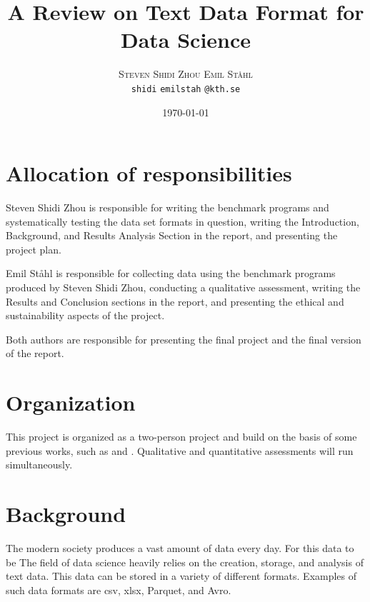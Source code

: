 \documentclass[12pt,twoside,english]{article}
\title{A Review on Text Data Format for Data Science}
\author{
        \textsc{Steven Shidi Zhou}
            \qquad
        \textsc{Emil Ståhl}
        \mbox{}\\
        \normalsize
            \texttt{shidi}
        \textbar{}
            \texttt{emilstah}
        \normalsize
            \texttt{@kth.se}
}
\date{\today}
\begin{document}
\maketitle





\section{Allocation of responsibilities}
\label{sect:alloc_responsibilities}
Steven Shidi Zhou is responsible for writing the benchmark programs and systematically testing the data set formats in question, writing the Introduction, Background, and Results Analysis Section in the report, and presenting the project plan. 

Emil Ståhl is responsible for collecting data using the benchmark programs produced by Steven Shidi Zhou, conducting a qualitative assessment, writing the Results and Conclusion sections in the report, and presenting the ethical and sustainability aspects of the project. 

Both authors are responsible for presenting the final project and the final version of the report.


\section{Organization}
\label{sect:organization}
This project is organized as a two-person project and build on the basis of some previous works, such as \cite{plase_comparison_2017} and \cite{blomer_quantitative_2018}. Qualitative and quantitative assessments will run simultaneously.
\section{Background}
\label{sect:background}
The modern society produces a vast amount of data every day. For this data to be 
The field of data science heavily relies on the creation, storage, and analysis of text data. This data can be stored in a variety of different formats. Examples of such data formats are csv, xlsx, Parquet, and Avro. 
\end{document}
